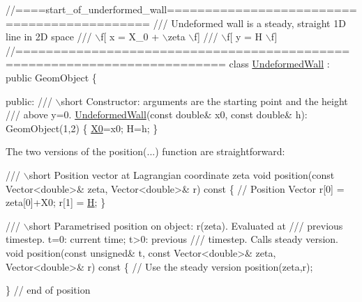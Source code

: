  
\begin{DoxyCodeInclude}
\textcolor{comment}{//====start\_of\_underformed\_wall============================================}
\textcolor{comment}{/// Undeformed wall is a steady, straight 1D line in 2D space }
\textcolor{comment}{}\textcolor{comment}{///  \(\backslash\)f[ x = X\_0 + \(\backslash\)zeta \(\backslash\)f]}
\textcolor{comment}{}\textcolor{comment}{///  \(\backslash\)f[ y = H \(\backslash\)f]}
\textcolor{comment}{}\textcolor{comment}{//=========================================================================}
\textcolor{keyword}{class }\hyperlink{classUndeformedWall}{UndeformedWall} : \textcolor{keyword}{public} GeomObject
\{

\textcolor{keyword}{public}:
\textcolor{comment}{}
\textcolor{comment}{ /// \(\backslash\)short Constructor: arguments are the starting point and the height}
\textcolor{comment}{ /// above y=0.}
\textcolor{comment}{} \hyperlink{classUndeformedWall_ad09cfdcd234be0ab47eb97a8a470602a}{UndeformedWall}(\textcolor{keyword}{const} \textcolor{keywordtype}{double}& x0, \textcolor{keyword}{const} \textcolor{keywordtype}{double}& h): GeomObject(1,2)
  \{
   \hyperlink{classUndeformedWall_a7ab875c46fef905df33eb47e0336581b}{X0}=x0;
   H=h;
  \}

\end{DoxyCodeInclude}


The two versions of the {\ttfamily position}(...) function are straightforward\+:


\begin{DoxyCodeInclude}
 
\textcolor{comment}{}
\textcolor{comment}{ /// \(\backslash\)short Position vector at Lagrangian coordinate zeta }
\textcolor{comment}{} \textcolor{keywordtype}{void} position(\textcolor{keyword}{const} Vector<double>& zeta, Vector<double>& r)\textcolor{keyword}{ const}
\textcolor{keyword}{  }\{
   \textcolor{comment}{// Position Vector}
   r[0] = zeta[0]+X0;
   r[1] = \hyperlink{namespaceGlobal__Physical__Variables_af6e07423e22c0991084d9a2f43727805}{H};
  \}

\textcolor{comment}{}
\textcolor{comment}{ /// \(\backslash\)short Parametrised position on object: r(zeta). Evaluated at}
\textcolor{comment}{ /// previous timestep. t=0: current time; t>0: previous}
\textcolor{comment}{ /// timestep. Calls steady version.}
\textcolor{comment}{} \textcolor{keywordtype}{void} position(\textcolor{keyword}{const} \textcolor{keywordtype}{unsigned}& t, \textcolor{keyword}{const} Vector<double>& zeta,
               Vector<double>& r)\textcolor{keyword}{ const}
\textcolor{keyword}{  }\{
   \textcolor{comment}{// Use the steady version}
   position(zeta,r);

  \} \textcolor{comment}{// end of position}

\end{DoxyCodeInclude}


